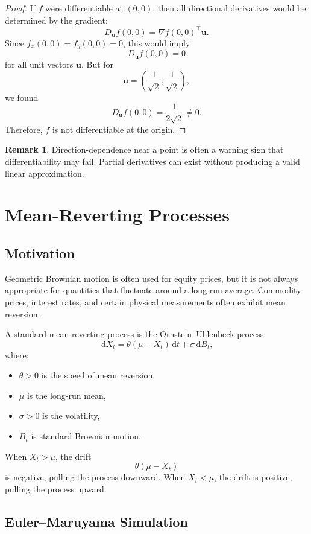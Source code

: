 \documentclass[12pt,oneside]{book}
\numberwithin{equation}{section}
\theoremstyle{definition}
\newtheorem{remark}{Remark}[section]
\theoremstyle{plain}
\theoremstyle{remark}
\newcommand{\dd}{\,\mathrm{d}}
\newcommand{\grad}{\nabla}
\begin{document}
\begin{proof}
If $f$ were differentiable at $(0,0)$, then all directional derivatives would be determined by the gradient:
\[
D_{\mathbf{u}}f(0,0)=\grad f(0,0)^\top \mathbf{u}.
\]
Since $f_x(0,0)=f_y(0,0)=0$, this would imply
\[
D_{\mathbf{u}}f(0,0)=0
\]
for all unit vectors $\mathbf{u}$. But for
\[
\mathbf{u}=\left(\frac{1}{\sqrt{2}},\frac{1}{\sqrt{2}}\right),
\]
we found
\[
D_{\mathbf{u}}f(0,0)=\frac{1}{2\sqrt{2}}\neq 0.
\]
Therefore, $f$ is not differentiable at the origin.
\end{proof}

\begin{remark}
Direction-dependence near a point is often a warning sign that differentiability may fail. Partial derivatives can exist without producing a valid linear approximation.
\end{remark}


\chapter{Mean-Reverting Processes}

\section{Motivation}

Geometric Brownian motion is often used for equity prices, but it is not always appropriate for quantities that fluctuate around a long-run average. Commodity prices, interest rates, and certain physical measurements often exhibit mean reversion.

A standard mean-reverting process is the Ornstein--Uhlenbeck process:
\[
\dd X_t=\theta(\mu-X_t)\dd t+\sigma\dd B_t,
\]
where:
\begin{itemize}
\item $\theta>0$ is the speed of mean reversion,
\item $\mu$ is the long-run mean,
\item $\sigma>0$ is the volatility,
\item $B_t$ is standard Brownian motion.
\end{itemize}

When $X_t>\mu$, the drift
\[
\theta(\mu-X_t)
\]
is negative, pulling the process downward. When $X_t<\mu$, the drift is positive, pulling the process upward.

\section{Euler--Maruyama Simulation}
\end{document}
